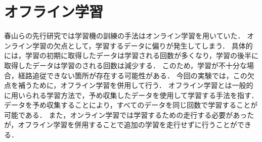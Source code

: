 \newpage
\section{オフライン学習}
春山らの先行研究では学習機の訓練の手法はオンライン学習を用いていた．
オンライン学習の欠点として，学習するデータに偏りが発生してしまう．
具体的には，学習の初期に取得したデータは学習される回数が多くなり，学習の後半に取得したデータは学習のされる回数は減少する．
このため，学習が不十分な場合，経路追従できない箇所が存在する可能性がある．
今回の実験では，この欠点を補うために，オフライン学習を併用して行う．
オフライン学習とは一般的に用いられる学習方法で，予め収集したデータを使用して学習する手法を指す．
データを予め収集することにより，すべてのデータを同じ回数で学習することが可能である．
また，オンライン学習では学習するための走行する必要があったが，オフライン学習を併用することで追加の学習を走行せずに行うことができる．